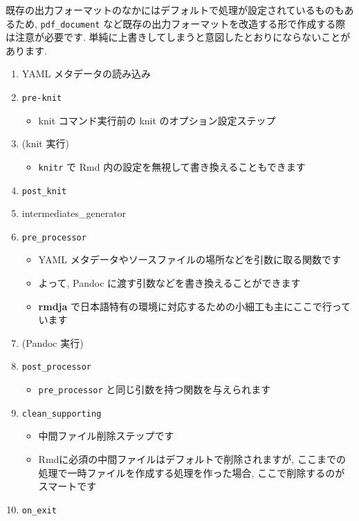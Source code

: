 \documentclass[
]{ltjsarticle}
\providecommand{\tightlist}{%
  \setlength{\itemsep}{0pt}\setlength{\parskip}{0pt}}
\begin{document}
既存の出力フォーマットのなかにはデフォルトで処理が設定されているものもあるため, \texttt{pdf\_document} など既存の出力フォーマットを改造する形で作成する際は注意が必要です. 単純に上書きしてしまうと意図したとおりにならないことがあります.

\begin{enumerate}
\def\labelenumi{\arabic{enumi}.}
\tightlist
\item
  YAML メタデータの読み込み
\item
  \texttt{pre-knit}

  \begin{itemize}
  \tightlist
  \item
    knit コマンド実行前の knit のオプション設定ステップ
  \end{itemize}
\item
  (knit 実行)

  \begin{itemize}
  \tightlist
  \item
    \texttt{knitr} で Rmd 内の設定を無視して書き換えることもできます
  \end{itemize}
\item
  \texttt{post\_knit}
\item
  intermediates\_generator
\item
  \texttt{pre\_processor}

  \begin{itemize}
  \tightlist
  \item
    YAML メタデータやソースファイルの場所などを引数に取る関数です
  \item
    よって, Pandoc に渡す引数などを書き換えることができます
  \item
    \textbf{rmdja} で日本語特有の環境に対応するための小細工も主にここで行っています
  \end{itemize}
\item
  (Pandoc 実行)
\item
  \texttt{post\_processor}

  \begin{itemize}
  \tightlist
  \item
    \texttt{pre\_processor} と同じ引数を持つ関数を与えられます
  \end{itemize}
\item
  \texttt{clean\_supporting}

  \begin{itemize}
  \tightlist
  \item
    中間ファイル削除ステップです
  \item
    Rmdに必須の中間ファイルはデフォルトで削除されますが, ここまでの処理で一時ファイルを作成する処理を作った場合, ここで削除するのがスマートです
  \end{itemize}
\item
  \texttt{on\_exit}
\end{enumerate}
\end{document}
